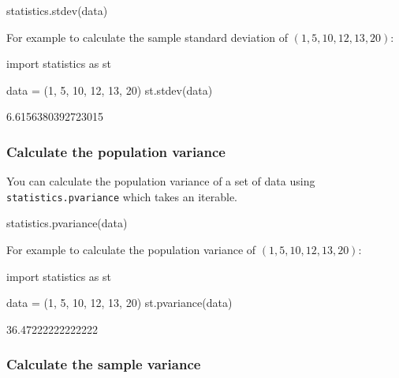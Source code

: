 \begin{api}
statistics.stdev(data)
\end{api}



For example to calculate the sample standard deviation of \((1, 5, 10, 12, 13, 20)\):




\begin{pyin}
import statistics as st

data = (1, 5, 10, 12, 13, 20)
st.stdev(data)
\end{pyin}





\begin{raw}
6.6156380392723015
\end{raw}





\subsubsection{Calculate the population variance}
\label{\detokenize{tools-for-mathematics/08-statistics/how/main:calculate-the-population-variance}}

You can calculate the population variance of a set of data using \texttt{statistics.pvariance} which takes an
iterable.


\begin{api}
statistics.pvariance(data)
\end{api}



For example to calculate the population variance of \((1, 5, 10, 12, 13, 20)\):




\begin{pyin}
import statistics as st

data = (1, 5, 10, 12, 13, 20)
st.pvariance(data)
\end{pyin}





\begin{raw}
36.47222222222222
\end{raw}





\subsubsection{Calculate the sample variance}
\label{\detokenize{tools-for-mathematics/08-statistics/how/main:calculate-the-sample-variance}}

